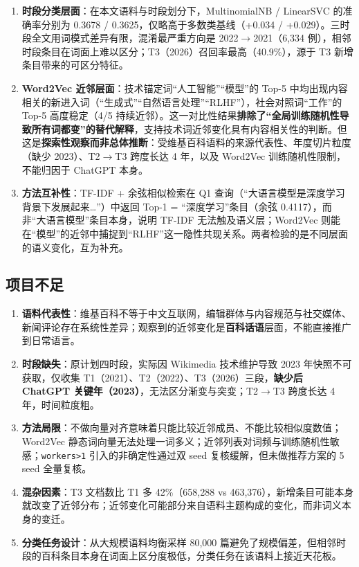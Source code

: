 \documentclass[12pt,a4paper]{article}
\begin{document}
\begin{enumerate}[leftmargin=2em,itemsep=2pt]
  \item \textbf{时段分类层面}：在本文语料与时段划分下，MultinomialNB / LinearSVC 的准确率分别为 0.3678 / 0.3625，仅略高于多数类基线（+0.034 / +0.029）。三时段全文用词模式差异有限，混淆最严重方向是 2022$\rightarrow$2021（6,334 例），相邻时段条目在词面上难以区分；T3（2026）召回率最高（40.9\%），源于 T3 新增条目带来的可区分特征。
  \item \textbf{Word2Vec 近邻层面}：技术锚定词“人工智能”“模型”的 Top-5 中均出现内容相关的新进入词（“生成式”“自然语言处理”“RLHF”），社会对照词“工作”的 Top-5 高度稳定（4/5 持续近邻）。这一对比性结果\textbf{排除了“全局训练随机性导致所有词都变”的替代解释}，支持技术词近邻变化具有内容相关性的判断。但这是\textbf{探索性观察而非总体推断}：受维基百科语料的来源代表性、年度切片粒度（缺少 2023）、T2$\rightarrow$T3 跨度长达 4 年，以及 Word2Vec 训练随机性限制，不能归因于 ChatGPT 本身。
  \item \textbf{方法互补性}：TF-IDF + 余弦相似检索在 Q1 查询（“大语言模型是深度学习背景下发展起来…”）中返回 Top-1 = “深度学习”条目（余弦 0.4117），而非“大语言模型”条目本身，说明 TF-IDF 无法触及语义层；Word2Vec 则能在“模型”的近邻中捕捉到“RLHF”这一隐性共现关系。两者检验的是不同层面的语义变化，互为补充。
\end{enumerate}

\subsection{项目不足}

\begin{enumerate}[leftmargin=2em,itemsep=2pt]
  \item \textbf{语料代表性}：维基百科不等于中文互联网，编辑群体与内容规范与社交媒体、新闻评论存在系统性差异；观察到的近邻变化是\textbf{百科话语}层面，不能直接推广到日常语言。
  \item \textbf{时段缺失}：原计划四时段，实际因 Wikimedia 技术维护导致 2023 年快照不可获取，仅收集 T1（2021）、T2（2022）、T3（2026）三段，\textbf{缺少后 ChatGPT 关键年（2023）}，无法区分渐变与突变；T2$\rightarrow$T3 跨度长达 4 年，时间粒度粗。
  \item \textbf{方法局限}：不做向量对齐意味着只能比较近邻成员、不能比较相似度数值；Word2Vec 静态词向量无法处理一词多义；近邻列表对词频与训练随机性敏感；\texttt{workers>1} 引入的非确定性通过双 seed 复核缓解，但未做推荐方案的 5 seed 全量复核。
  \item \textbf{混杂因素}：T3 文档数比 T1 多 42\%（658,288 vs 463,376），新增条目可能本身就改变了近邻分布；近邻变化可能部分来自语料主题构成的变化，而非词义本身的变迁。
  \item \textbf{分类任务设计}：从大规模语料均衡采样 80,000 篇避免了规模偏差，但相邻时段的百科条目本身在词面上区分度极低，分类任务在该语料上接近天花板。
\end{enumerate}
\end{document}
